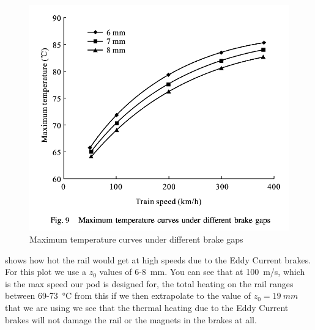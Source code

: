 \documentclass[main.tex]{subfiles}
\begin{document}
    \begin{figure}[H]
    	\centering
        \includegraphics[width=\linewidth]{images/EC_heat}
        \caption{Maximum temperature curves under different brake gaps}
        \label{fig:ec-heat}
    \end{figure}
     shows how hot the rail would get at high speeds due to the Eddy Current brakes. For this plot we use a $z_0$ values of 6-\SI{8}{mm}. You can see that at \SI{100}{m/s}, which is the max speed our pod is designed for, the total heating on the rail ranges between 69-\SI{73}{\celsius} from this if we then extrapolate to the value of $z_0 = \SI{19}{mm}$ that we are using we see that the thermal heating due to the Eddy Current brakes will not damage the rail or the magnets in the brakes at all.
\end{document}
